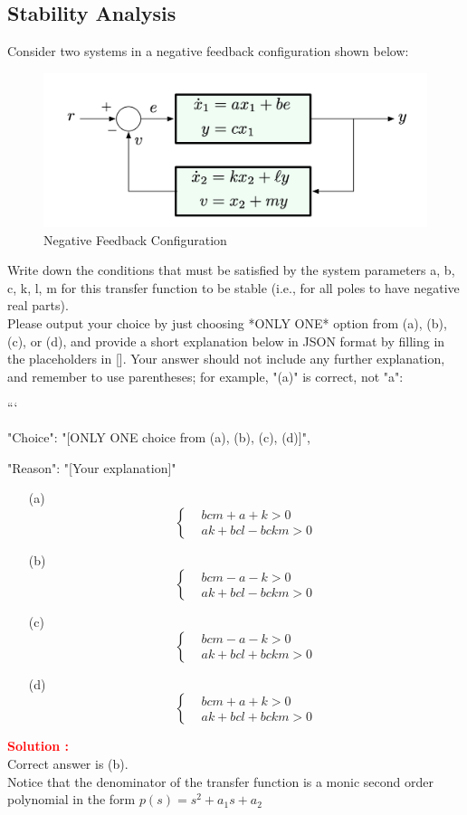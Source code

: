 \documentclass[12pt]{article}
\begin{document}
\subsection{Stability Analysis}

Consider two systems in a negative feedback configuration shown below:
\begin{figure}[h!]
    \centering
    \includegraphics[width=0.75\linewidth]{figs/4.5.png}
    \caption{Negative Feedback Configuration}
    \label{fig:enter-label}
\end{figure}


Write down the conditions that must be satisfied by the system parameters
a, b, c, k, l, m for this transfer function to be stable (i.e., for all poles to have
negative real parts). \\
Please output your choice by just choosing *ONLY ONE* option from (a), (b), (c), or (d), and provide a short explanation below in JSON format by filling in the placeholders in []. Your answer should not include any further explanation, and remember to use parentheses; for example, "(a)" is correct, not "a":

```
{

"Choice": "[ONLY ONE choice from (a), (b), (c), (d)]",

"Reason": "[Your explanation]"

}

\begin{itemize}
    \item[(a)] $$
\left\{\begin{aligned}
& b c m+a+k>0 \\
& a k+b c l-b c k m>0
\end{aligned}\right.
$$
    \item[(b)] $$
\left\{\begin{aligned}
& b c m-a-k>0 \\
& a k+b c l-b c k m>0
\end{aligned}\right.
$$
    \item[(c)] $$
\left\{\begin{aligned}
& b c m-a-k>0 \\
& a k+b c l+b c k m>0
\end{aligned}\right.
$$
    \item[(d)] $$
\left\{\begin{aligned}
& b c m+a+k>0 \\
& a k+b c l+b c k m>0
\end{aligned}\right.
$$
\end{itemize}
\textbf{\textcolor{red}{Solution :}} \\
Correct answer is (b).\\
Notice that the denominator of the transfer function is a monic second order polynomial in the form $p(s)=s^{2}+a_{1} s+a_{2} $
\end{document}
